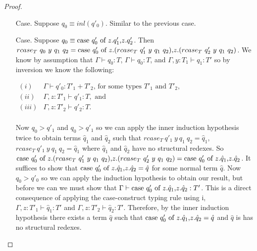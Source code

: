 \begin{proof}
\begin{itemize}
\begin{itemize}
\begin{itemize}
    \item[Case.] Suppose $q_0 \equiv inl(q'_0)$.  Similar to the previous case.
      
    \item[Case.] Suppose $q_0 \equiv \mbox{case}\ q'_0\ \text{of}\ z\text{.}q'_1\text{,}z\text{.}q'_2$.  Then \\
      $rcase_{T}\ q_0\ y\ q_1\ q_2 = \ccon{q'_0}{z}{(rcase_{T}\ q'_1\ y\ q_1\ q_2)}{(rcase_{T}\ q'_2\ y\ q_1\ q_2)}$.
      We know by assumption that $\Gamma \vdash q_0:T$, $\Gamma \vdash q_0:T$, and $\Gamma, y:T_1 \vdash q_1:T'$
      so by inversion we know the following:
      \begin{center}
        \begin{math}
          \begin{array}{lll}
            (i) & \Gamma \vdash q'_0:T'_1 + T'_2 \text{, for some types } T'_1 \text{ and } T'_2,\\
            (ii) & \Gamma, z:T'_1 \vdash q'_1:T, \text{ and }\\
            (iii) & \Gamma, z:T'_2 \vdash q'_2:T.\\
          \end{array}
        \end{math}
      \end{center}
      Now $q_0 > q'_1$ and $q_0 > q'_1$ so we can apply the inner induction hypothesis twice to obtain terms $\hat{q}_1$ and
      $\hat{q}_2$ such that $rcase_{T}\ q'_1\ y\ q_1\ q_2 = \hat{q}_1$, $rcase_{T}\ q'_1\ y\ q_1\ q_2 = \hat{q}_1$ where 
      $\hat{q}_1$ and $\hat{q}_2$ have no structural redexes. So
      $\ccon{q'_0}{z}{(rcase_{T}\ q'_1\ y\ q_1\ q_2)}{(rcase_{T}\ q'_2\ y\ q_1\ q_2)} = 
      \ccon{q'_0}{z}{\hat{q}_1}{\hat{q}_2}$.  It suffices to show that $\mbox{case}\ q'_0\ \text{of}\ z\text{.}\hat{q}_1\text{,}z\text{.}\hat{q}_2 = \hat{q}$ 
      for some normal term $\hat{q}$.  Now $q_0 > q'_0$ so we can apply the induction hypothesis
      to obtain our result, but before we can we must show that $\Gamma \vdash \mbox{case}\ q'_0\ \text{of}\ z\text{.}\hat{q}_1\text{,}z\text{.}\hat{q}_2:T'$.
      This is a direct consequence of applying the case-construct typing rule using i, $\Gamma, z:T'_1 \vdash \hat{q}_1:T'$
      and $\Gamma, z:T'_2 \vdash \hat{q}_2:T'$.  Therefore, by the inner induction hypothesis there exists a term $\hat{q}$ 
      such that $\mbox{case}\ q'_0\ \text{of}\ z\text{.}\hat{q}_1\text{,}z\text{.}\hat{q}_2 = \hat{q}$ and $\hat{q}$ is has no structural redexes.
    \end{itemize}
  \end{itemize}
\end{itemize}
\end{proof}
